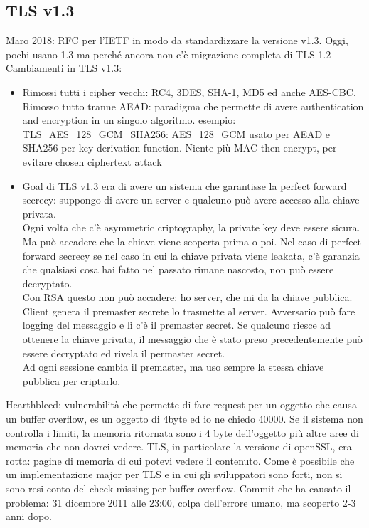 \documentclass[16px]{article}
\begin{document}
\subsection{TLS v1.3}
Maro 2018: RFC per l'IETF in modo da standardizzare la versione v1.3. Oggi, pochi usano 1.3 ma perché ancora non c'è migrazione completa di TLS 1.2\\ Cambiamenti in TLS v1.3:
\begin{itemize}
\item Rimossi tutti i cipher vecchi: RC4, 3DES, SHA-1, MD5 ed anche AES-CBC. Rimosso tutto tranne AEAD: paradigma che permette di avere authentication and encryption in un singolo algoritmo. esempio: TLS\_AES\_128\_GCM\_SHA256: AES\_128\_GCM usato per AEAD e SHA256 per key derivation function. Niente più MAC then encrypt, per evitare chosen ciphertext attack
\item Goal di TLS v1.3 era di avere un sistema che garantisse la perfect forward secrecy: suppongo di avere un server e qualcuno può avere accesso alla chiave privata.\\ Ogni volta che c'è asymmetric criptography, la private key deve essere sicura. Ma può accadere che la chiave viene scoperta prima o poi. Nel caso di perfect forward secrecy se nel caso in cui la chiave privata viene leakata, c'è garanzia che qualsiasi cosa hai fatto nel passato rimane nascosto, non può essere decryptato.\\ Con RSA questo non può accadere: ho server, che mi da la chiave pubblica. Client genera il premaster secrete lo trasmette al server. Avversario può fare logging del messaggio e lì c'è il premaster secret. Se qualcuno riesce ad ottenere la chiave privata, il messaggio che è stato preso precedentemente può essere decryptato ed rivela il permaster secret.\\ Ad ogni sessione cambia il premaster, ma uso sempre la stessa chiave pubblica per criptarlo.
\end{itemize}
Hearthbleed: vulnerabilità che permette di fare request per un oggetto che causa un buffer overflow, es un oggetto di 4byte ed io ne chiedo 40000. Se il sistema non controlla i limiti, la memoria ritornata sono i 4 byte dell'oggetto più altre aree di memoria che non dovrei vedere. TLS, in particolare la versione di openSSL, era rotta: pagine di memoria di cui potevi vedere il contenuto. Come è possibile che un implementazione major per TLS e in cui gli sviluppatori sono forti, non si sono resi conto del check missing per buffer overflow. Commit che ha causato il problema: 31 dicembre 2011 alle 23:00, colpa dell'errore umano, ma scoperto 2-3 anni dopo.
\end{document}
